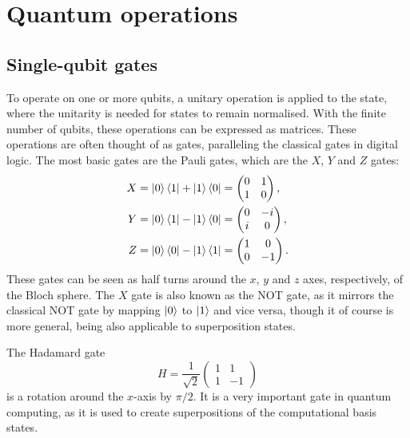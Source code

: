 \section{Quantum operations}
\subsection{Single-qubit gates}
To operate on one or more qubits, a unitary operation is applied to the state, where the unitarity is needed for states to remain normalised.
With the finite number of qubits, these operations can be expressed as matrices.
These operations are often thought of as gates, paralleling the classical gates in digital logic.
The most basic gates are the Pauli gates, which are the $X$, $Y$ and $Z$ gates:
\begin{align}
    X =\ket{0}\bra{1} + \ket{1}\bra{0} & = \begin{pmatrix} 0 & 1 \\ 1 & 0 \end{pmatrix},  \\
    Y =\ket{0}\bra{1} - \ket{1}\bra{0} & = \begin{pmatrix} 0 & -i \\ i & 0 \end{pmatrix}, \\
    Z =\ket{0}\bra{0} - \ket{1}\bra{1} & = \begin{pmatrix} 1 & 0 \\ 0 & -1 \end{pmatrix}.
\end{align}
These gates can be seen as half turns around the $x$, $y$ and $z$ axes, respectively, of the Bloch sphere.
The $X$ gate is also known as the NOT gate, as it mirrors the classical NOT gate by mapping $\ket{0}$ to $\ket{1}$ and vice versa, though it of course is more general, being also applicable to superposition states.

The Hadamard gate
\begin{equation}
    H = \frac{1}{\sqrt{2}} \begin{pmatrix} 1 & 1 \\ 1 & -1 \end{pmatrix}
\end{equation}
is a rotation around the $x$-axis by $\pi/2$.
It is a very important gate in quantum computing, as it is used to create superpositions of the computational basis states.


